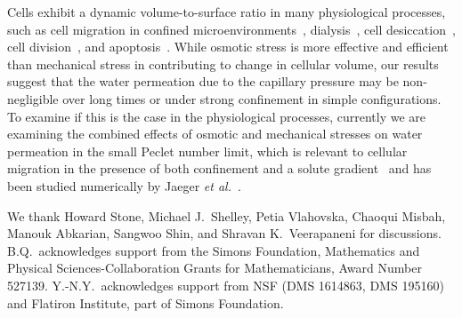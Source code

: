 \documentclass[prb,preprint,showpacs,preprintnumbers,amsmath,amssymb,longbibliography]{revtex4-1}
\begin{document}
Cells exhibit a dynamic volume-to-surface ratio in 
many physiological processes, such as 
cell migration in confined microenvironments~\cite{StrokaJiangChenEtAl2014_Cell, papadopoulos2008aquaporins}, 
dialysis~\cite{wan2006}, cell desiccation~\cite{vogl2014effect}, cell division~\cite{OdermattMiettinenKangEtAl2020_bioRxiv}, and
apoptosis~\cite{marchetti1996mitochondrial}.
While osmotic stress  is more effective and efficient than mechanical stress in contributing to change in cellular volume, our results suggest that the water permeation due to the capillary pressure may be non-negligible over long times or under strong confinement in simple configurations. 
To examine if this is the case in the physiological processes,  currently we are examining the combined effects of osmotic and mechanical stresses on water permeation in the small Peclet number limit, which is relevant to cellular migration in the presence of both confinement and a solute gradient~\cite{StrokaJiangChenEtAl2014_Cell} and has been studied numerically by Jaeger {\em et al.}~\cite{jae-car-med-try1999}.


\acknowledgments
We thank Howard Stone, Michael J.~Shelley, Petia Vlahovska,
Chaoqui Misbah, Manouk Abkarian, Sangwoo Shin, and Shravan
K.~Veerapaneni for discussions. B.Q.~acknowledges support from the
Simons Foundation, Mathematics and Physical Sciences-Collaboration
Grants for Mathematicians, Award Number 527139.  Y.-N.Y.~acknowledges
support from NSF (DMS 1614863, DMS 195160) and Flatiron Institute, part
of Simons Foundation.

\bigskip
 
 
\end{document}
